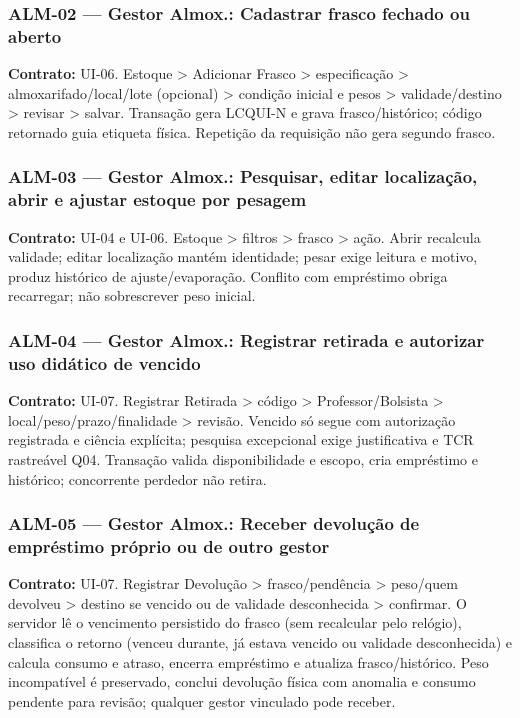 \subsubsection{ALM-02 --- Gestor Almox.: Cadastrar frasco fechado ou aberto}
\textbf{Contrato:} UI-06. Estoque > Adicionar Frasco > especificação > almoxarifado/local/lote (opcional) > condição inicial e pesos > validade/destino > revisar > salvar. Transação gera LCQUI-N e grava frasco/histórico; código retornado guia etiqueta física. Repetição da requisição não gera segundo frasco.

\subsubsection{ALM-03 --- Gestor Almox.: Pesquisar, editar localização, abrir e ajustar estoque por pesagem}
\textbf{Contrato:} UI-04 e UI-06. Estoque > filtros > frasco > ação. Abrir recalcula validade; editar localização mantém identidade; pesar exige leitura e motivo, produz histórico de ajuste/evaporação. Conflito com empréstimo obriga recarregar; não sobrescrever peso inicial.

\subsubsection{ALM-04 --- Gestor Almox.: Registrar retirada e autorizar uso didático de vencido}
\textbf{Contrato:} UI-07. Registrar Retirada > código > Professor/Bolsista > local/peso/prazo/finalidade > revisão. Vencido só segue com autorização registrada e ciência explícita; pesquisa excepcional exige justificativa e TCR rastreável Q04. Transação valida disponibilidade e escopo, cria empréstimo e histórico; concorrente perdedor não retira.

\subsubsection{ALM-05 --- Gestor Almox.: Receber devolução de empréstimo próprio ou de outro gestor}
\textbf{Contrato:} UI-07. Registrar Devolução > frasco/pendência > peso/quem devolveu > destino se vencido ou de validade desconhecida > confirmar. O servidor lê o vencimento persistido do frasco (sem recalcular pelo relógio), classifica o retorno (venceu durante, já estava vencido ou validade desconhecida) e calcula consumo e atraso, encerra empréstimo e atualiza frasco/histórico. Peso incompatível é preservado, conclui devolução física com anomalia e consumo pendente para revisão; qualquer gestor vinculado pode receber.

